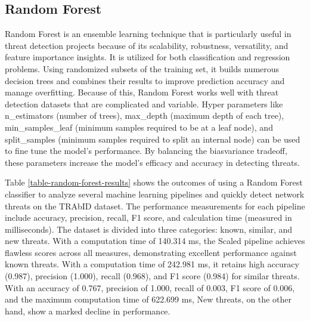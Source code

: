 


\subsection{Random Forest}

Random Forest is an ensemble learning technique that is particularly useful in threat detection projects because of its scalability, robustness, versatility, and feature importance insights. It is utilized for both classification and regression problems. Using randomized subsets of the training set, it builds numerous decision trees and combines their results to improve prediction accuracy and manage overfitting. Because of this, Random Forest works well with threat detection datasets that are complicated and variable. Hyper parameters like n\_estimators (number of trees), max\_depth (maximum depth of each tree), min\_samples\_leaf (minimum samples required to be at a leaf node), and split\_samples (minimum samples required to split an internal node) can be used to fine tune the model's performance. By balancing the bias\-variance trade\-off, these parameters increase the model's efficacy and accuracy in detecting threats.

Table \ref{table-random-forest-results} shows the outcomes of using a Random Forest classifier to analyze several machine learning pipelines and quickly detect network threats on the TRAbID dataset. The performance measurements for each pipeline include accuracy, precision, recall, F1 score, and calculation time (measured in milliseconds). The dataset is divided into three categories: known, similar, and new threats. With a computation time of 140.314 ms, the Scaled pipeline achieves flawless scores across all measures, demonstrating excellent performance against known threats. With a computation time of 242.981 ms, it retains high accuracy (0.987), precision (1.000), recall (0.968), and F1 score (0.984) for similar threats. With an accuracy of 0.767, precision of 1.000, recall of 0.003, F1 score of 0.006, and the maximum computation time of 622.699 ms, New threats, on the other hand, show a marked decline in performance.



